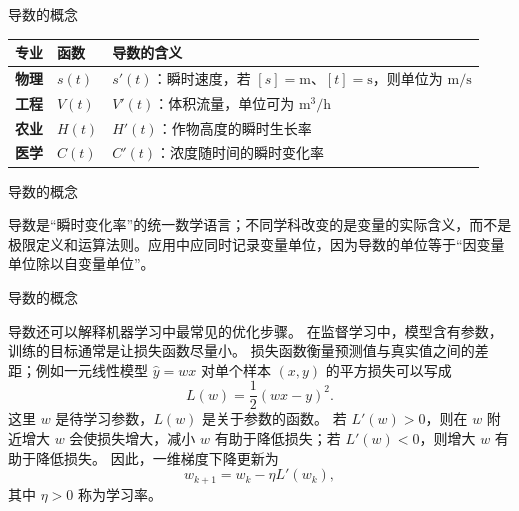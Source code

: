 \documentclass[aspectratio=169,10pt,fontset=fandol]{ctexbeamer}
\begin{document}
\begin{frame}[t,fragile]{导数的概念}
\normalsize
{\normalsize
\begin{center}
\small
\begin{tabularx}{\textwidth}{>{\bfseries}p{1.4cm} p{2.0cm} X}
\toprule
专业 & 函数 & 导数的含义 \\
\midrule
物理 & $s(t)$ & $s'(t)$：瞬时速度，若 $[s]=\mathrm m$、$[t]=\mathrm s$，则单位为 $\mathrm{m/s}$ \\
工程 & $V(t)$ & $V'(t)$：体积流量，单位可为 $\mathrm{m^3/h}$ \\
农业 & $H(t)$ & $H'(t)$：作物高度的瞬时生长率 \\
医学 & $C(t)$ & $C'(t)$：浓度随时间的瞬时变化率 \\
\bottomrule
\end{tabularx}
\end{center}
}
\end{frame}
\begin{frame}[t,fragile]{导数的概念}
\normalsize
{\normalsize
导数是“瞬时变化率”的统一数学语言；不同学科改变的是变量的实际含义，而不是极限定义和运算法则。应用中应同时记录变量单位，因为导数的单位等于“因变量单位除以自变量单位”。


}
\end{frame}
\begin{frame}[t,fragile]{导数的概念}
\footnotesize
{\footnotesize
\begin{application}[导数与梯度下降的基本思想]
	
	导数还可以解释机器学习中最常见的优化步骤。 在监督学习中，模型含有参数，训练的目标通常是让损失函数尽量小。 损失函数衡量预测值与真实值之间的差距；例如一元线性模型 $\hat y=wx$ 对单个样本 $(x,y)$ 的平方损失可以写成
	\[
	L(w)=\frac12(wx-y)^2.
	\]
	这里 $w$ 是待学习参数，$L(w)$ 是关于参数的函数。 若 $L'(w)>0$，则在 $w$ 附近增大 $w$ 会使损失增大，减小 $w$ 有助于降低损失；若 $L'(w)<0$，则增大 $w$ 有助于降低损失。 因此，一维梯度下降更新为
	\[
	w_{k+1}=w_k-\eta L'(w_k),
	\]
	其中 $\eta>0$ 称为学习率。
	

\end{application}
}
\end{frame}
\end{document}
